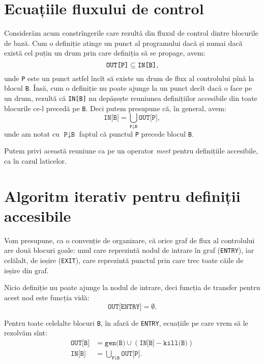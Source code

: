 \section{Ecuațiile fluxului de control}

Considerăm acum constrîngerile care rezultă din fluxul de control dintre
blocurile de bază. Cum o definiție atinge un punct al programului dacă și numai
dacă există cel puțin un drum prin care definiția să se propage, avem:
\[
  \texttt{OUT[P]} \subseteq \texttt{IN[B]},
\]
unde \texttt{P} este un punct astfel încît să existe un drum de flux al
controlului pînă la blocul \texttt{B}. Însă, cum o definiție nu poate ajunge la
un punct decît dacă o face pe un drum, rezultă că \texttt{IN[B]} nu
depășește reuniunea definițiilor accesibile din toate blocurile ce-l
precedă pe \texttt{B}. Deci putem presupune că, în general, avem:
\[
  \texttt{IN[B]} = \bigcup_{\texttt{P} \downarrow \texttt{B}} \texttt{OUT[P]},
\]
unde am notat cu $ \texttt{P} \downarrow \texttt{B} $ faptul că punctul \texttt{P}
precede blocul \texttt{B}.

Putem privi această reuniune ca pe un operator \emph{meet} pentru
definițiile accesibile, ca în cazul laticelor.

\section{Algoritm iterativ pentru definiții accesibile}

Vom presupune, ca o convenție de organizare, că orice graf de flux al
controlului are două blocuri goale: unul care reprezintă nodul de intrare
în graf (\texttt{ENTRY}), iar celălalt, de ieșire (\texttt{EXIT}), care reprezintă
punctul prin care trec toate căile de ieșire din graf.

Nicio definiție nu poate ajunge la nodul de intrare, deci funcția
de transfer pentru acest nod este funcția vidă:
\[
  \texttt{OUT[ENTRY]} = \emptyset.
\]

Pentru toate celelalte blocuri \texttt{B}, în afară de \texttt{ENTRY},
ecuațiile pe care vrem să le rezolvăm sînt:
\begin{align*}
  \texttt{OUT[B]} &= \texttt{gen(B)} \cup (\texttt{IN[B]} - \texttt{kill(B)}) \\
  \texttt{IN[B]} &= \bigcup_{\texttt{P} \downarrow \texttt{B}} \texttt{OUT[P]}.
\end{align*}


